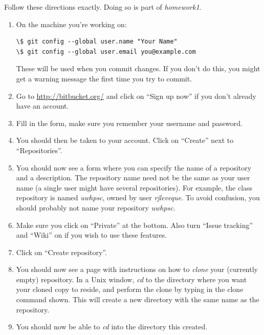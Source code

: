 \documentclass[letterpaper,10pt,english]{sphinxmanual}
\begin{document}
Follow these directions exactly.  Doing so is part of \emph{homework1}.
\begin{enumerate}
\item {} 
On the machine you're working on:

\begin{Verbatim}[commandchars=\\\{\}]
\$ git config --global user.name "Your Name"
\$ git config --global user.email you@example.com
\end{Verbatim}

These will be used when you commit changes.
If you don't do this, you might get a warning message
the first time you try to commit.

\item {} 
Go to \href{http://bitbucket.org/}{http://bitbucket.org/} and click on ``Sign up now'' if you don't
already have an account.

\item {} 
Fill in the form, make sure you remember your username and password.

\item {} 
You should then be taken to your account.  Click on ``Create'' next
to ``Repositories''.

\item {} 
You should now see a form where you can specify the name of a repository
and a description.  The repository name need not be the same as your user
name (a single user might have several repositories).  For example, the class
repository is named \emph{uwhpsc}, owned by user \emph{rjleveque}.
To avoid confusion, you should probably not name your repository
\emph{uwhpsc}.

\item {} 
Make sure you click on ``Private'' at the bottom.  Also turn ``Issue
tracking'' and ``Wiki'' on if you wish to use these features.

\item {} 
Click on ``Create repository''.

\item {} 
You should now see a page with instructions on how to \emph{clone} your
(currently empty) repository.  In a Unix window, \emph{cd} to the directory where
you want your cloned copy to reside, and perform the clone by typing in
the clone command shown.  This will create a new directory with the same
name as the repository.

\item {} 
You should now be able to \emph{cd} into the directory this created.


\end{enumerate}
\end{document}
